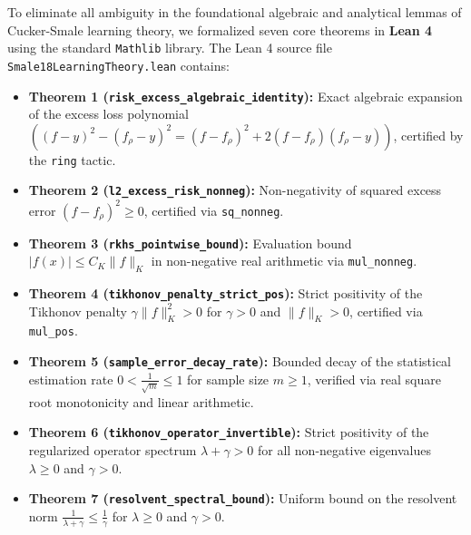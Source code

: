 \documentclass[11pt,a4paper]{article}
\theoremstyle{definition}
\begin{document}
To eliminate all ambiguity in the foundational algebraic and analytical lemmas of Cucker-Smale learning theory, we formalized seven core theorems in \textbf{Lean 4} using the standard \texttt{Mathlib} library.
The Lean 4 source file \texttt{Smale18LearningTheory.lean} contains:
\begin{itemize}
    \item \textbf{Theorem 1 (\texttt{risk\_excess\_algebraic\_identity}):} Exact algebraic expansion of the excess loss polynomial $((f-y)^2 - (f_\rho - y)^2 = (f-f_\rho)^2 + 2(f-f_\rho)(f_\rho - y))$, certified by the \texttt{ring} tactic.
    \item \textbf{Theorem 2 (\texttt{l2\_excess\_risk\_nonneg}):} Non-negativity of squared excess error $(f - f_\rho)^2 \ge 0$, certified via \texttt{sq\_nonneg}.
    \item \textbf{Theorem 3 (\texttt{rkhs\_pointwise\_bound}):} Evaluation bound $|f(x)| \le C_K \|f\|_K$ in non-negative real arithmetic via \texttt{mul\_nonneg}.
    \item \textbf{Theorem 4 (\texttt{tikhonov\_penalty\_strict\_pos}):} Strict positivity of the Tikhonov penalty $\gamma \|f\|_K^2 > 0$ for $\gamma > 0$ and $\|f\|_K > 0$, certified via \texttt{mul\_pos}.
    \item \textbf{Theorem 5 (\texttt{sample\_error\_decay\_rate}):} Bounded decay of the statistical estimation rate $0 < \frac{1}{\sqrt{m}} \le 1$ for sample size $m \ge 1$, verified via real square root monotonicity and linear arithmetic.
    \item \textbf{Theorem 6 (\texttt{tikhonov\_operator\_invertible}):} Strict positivity of the regularized operator spectrum $\lambda + \gamma > 0$ for all non-negative eigenvalues $\lambda \ge 0$ and $\gamma > 0$.
    \item \textbf{Theorem 7 (\texttt{resolvent\_spectral\_bound}):} Uniform bound on the resolvent norm $\frac{1}{\lambda + \gamma} \le \frac{1}{\gamma}$ for $\lambda \ge 0$ and $\gamma > 0$.
\end{itemize}
\end{document}
